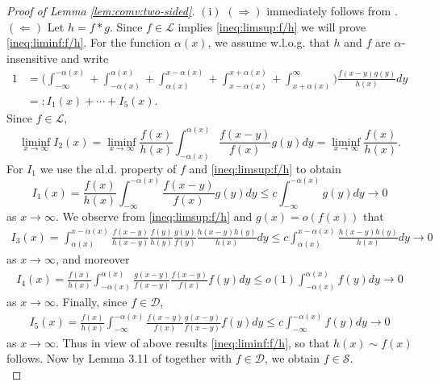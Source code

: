 \documentclass[12pt,leqno]{amsart}
\newcommand{\cals}{{\mathcal S}}
\newcommand{\call}{{\mathcal L}}
\newcommand{\cald}{{\mathcal D}}
\newcommand{\1}{{\mathbf 1}}
\begin{document}
\begin{proof}[Proof of Lemma \ref{lem:comv:two-sided}]
$(\mathrm{i})$ $(\Rightarrow)$ immediately follows from \cite[Proposition 3.12 ({\rm i})]{matsui:2022}. \\
$(\Leftarrow)$ 
Let $h=f\ast g$. 
Since $f\in \call$ implies \eqref{ineq:limsup:f/h} we will prove \eqref{ineq:liminf:f/h}. 
For the function $\alpha(x)$, we assume w.l.o.g. that $h$ and $f$ are $\alpha$-insensitive and write
\begin{align*}
 1&=\Big(
\int_{-\infty}^{-\alpha(x)} + \int_{-\alpha(x)}^{\alpha(x)} +\int_{\alpha(x)}^{x-\alpha(x)} +
\int_{x-\alpha(x)}^{x+\alpha(x)} +\int_{x+\alpha(x)}^\infty
\Big) \frac{f(x-y) g(y)}{h(x)} dy \\
&=: I_1(x)+\cdots+I_5(x). 
\end{align*}
Since $f\in \call$, 
\[
 \liminf_{x\to\infty} I_2(x) = \liminf_{x\to\infty} \frac{f(x)}{h(x)} \int_{-\alpha(x)}^{\alpha(x)} \frac{f(x-y)}{f(x)}g(y)dy = 
\liminf_{x\to\infty} \frac{f(x)}{h(x)}.
\]
For $I_1$ we use the al.d. property of $f$ and \eqref{ineq:limsup:f/h} to obtain
\[
 I_1(x) = \frac{f(x)}{h(x)} \int_{-\infty}^{-\alpha(x)} \frac{f(x-y)}{f(x)}g(y)dy \le c\int_{-\infty}^{-\alpha(x)}g(y)dy \to 0
\]
as $x\to\infty$. 
We observe from \eqref{ineq:limsup:f/h} and $g(x)=o(f(x))$ that 
\begin{align*}
 I_3(x)=\int_{\alpha(x)}^{x-\alpha(x)} \frac{f(x-y)}{h(x-y)} \frac{f(y)}{h(y)} \frac{g(y)}{f(y)} \frac{h(x-y)h(y)}{h(x)}dy 
\le c \int_{\alpha(x)}^{x-\alpha(x)} \frac{h(x-y)h(y)}{h(x)}dy \to 0%
\end{align*}
as $x\to\infty$, and moreover
\begin{align*}
 I_4(x)=\frac{f(x)}{h(x)}\int_{-\alpha(x)}^{\alpha(x)} \frac{g(x-y)}{f(x-y)} \frac{f(x-y)}{f(x)} f(y)dy \le o(1) \int^{\alpha(x)}_{-\alpha(x)} f(y)dy \to 0
\end{align*}
as $x\to\infty$.
Finally, since $f\in \cald$,  
\begin{align*}
 I_5(x) = \frac{f(x)}{h(x)} \int_{-\infty}^{-\alpha(x)} 
\frac{f(x-y)}{f(x)} \frac{g(x-y)}{f(x-y)} f(y)dy 
 \le c \int_{-\infty}^{-\alpha(x)} f(y)dy \to 0 %
\end{align*}
as $x \to \infty$.
Thus in view of above results \eqref{ineq:liminf:f/h}, so that $h(x)\sim f(x)$ follows. 
Now by Lemma 3.11 of \cite{matsui:2022} together with $f\in \cald$, we obtain $f\in \cals$. \\


\end{proof}
\end{document}
